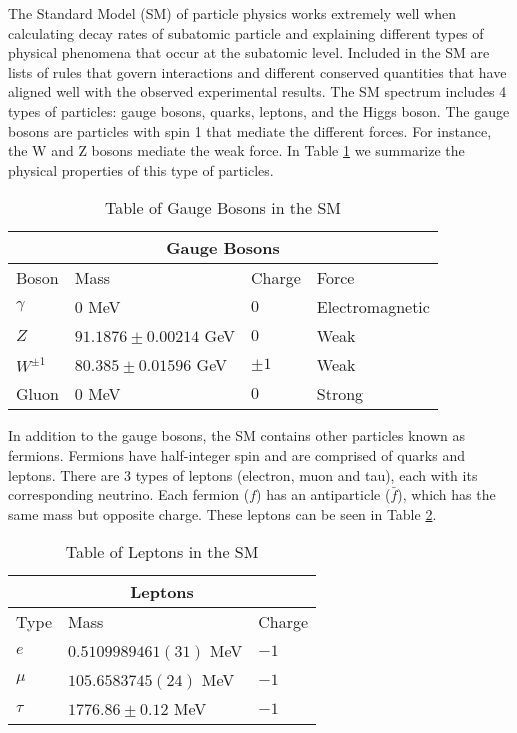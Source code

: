 \documentclass[12pt]{article}
\def \[{\left[}
\def \ga{\gamma}
\begin{document}
The Standard Model (SM) of particle physics works extremely well when calculating decay rates of subatomic particle and explaining different types of physical phenomena that occur at the subatomic level. Included in the SM are lists of rules that govern interactions and different conserved quantities that have aligned well with the observed experimental results. The SM spectrum includes 4 types of particles: gauge bosons, quarks, leptons, and the Higgs boson. The gauge bosons are particles with spin 1 that mediate the different forces. For instance, the W and Z bosons mediate the weak force. In Table \ref{table:1} we summarize the physical properties of this type of particles. 
%
\begin{table}[htbp!]
\centering
\begin{tabular}{ |p{2cm}||p{5cm}|p{1.5cm}|p{3cm}|  }
 \hline
 \multicolumn{4}{|c|}{Gauge Bosons} \\
 \hline
 Boson & Mass & Charge & Force\\
 \hline
 $\ga$ & $0$ MeV & $0$ & Electromagnetic\\ [1ex]
 $Z$ &  $91.1876\pm 0.00214$ GeV & $0$ & Weak\\ [1ex]
 $W^{\pm 1}$ &$80.385 \pm 0.01596$ GeV & $\pm 1$ & Weak\\[1ex]
 Gluon & $0$ MeV &$0$ & Strong \\[1ex]
 \hline 
\end{tabular}
\caption{Table of Gauge Bosons in the SM \cite{Agashe:2014kda}}
\label{table:1}
\end{table}

In addition to the gauge bosons, the SM contains other particles known as fermions. Fermions have half-integer spin and are comprised of quarks and leptons. There are 3 types of leptons (electron, muon and tau), each with its corresponding neutrino. Each fermion ($f$) has an antiparticle ($\bar f$), which has the same mass but opposite charge. These leptons can be seen in Table \ref{table:2}.
\begin{table}[htbp!]
\centering
\begin{tabular}{ |p{1cm}||p{4.5cm}|p{1.5cm}| }
 \hline
 \multicolumn{3}{|c|}{Leptons} \\
 \hline
 Type & Mass & Charge\\
 \hline
 $e$ & $0.5109989461(31)$ MeV & $-1$ \\ [1ex]
 $\mu$ &  $105.6583745(24)$ MeV & $-1$ \\ [1ex]
 $\tau$ &$1776.86\pm 0.12$ MeV & $-1$ \\[1ex]
 \hline 
\end{tabular}
\caption{Table of Leptons in the SM \cite{Agashe:2014kda}}
\label{table:2}
\end{table}
\end{document}
